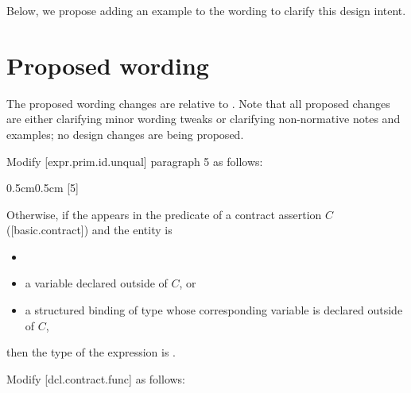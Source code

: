 Below, we propose adding an example to the wording to clarify this design intent.

\section{Proposed wording}

The proposed wording changes are relative to \cite{P2900R10}. Note that all proposed changes are either clarifying minor wording tweaks or clarifying non-normative notes and examples; no design changes are being proposed.

Modify [expr.prim.id.unqual] paragraph 5 as follows:
\begin{adjustwidth}{0.5cm}{0.5cm}
[5] 

\added{[6] }Otherwise, if the  appears in the predicate of a contract
assertion $C$ ([basic.contract]) and the entity is
\begin{itemize}
\item {}
\item a variable declared outside of $C$, or 
\item a structured binding of type  whose corresponding variable is declared outside of $C$, 
\end{itemize}

then the type of the expression is .
\end{adjustwidth}

Modify [dcl.contract.func] as follows:

